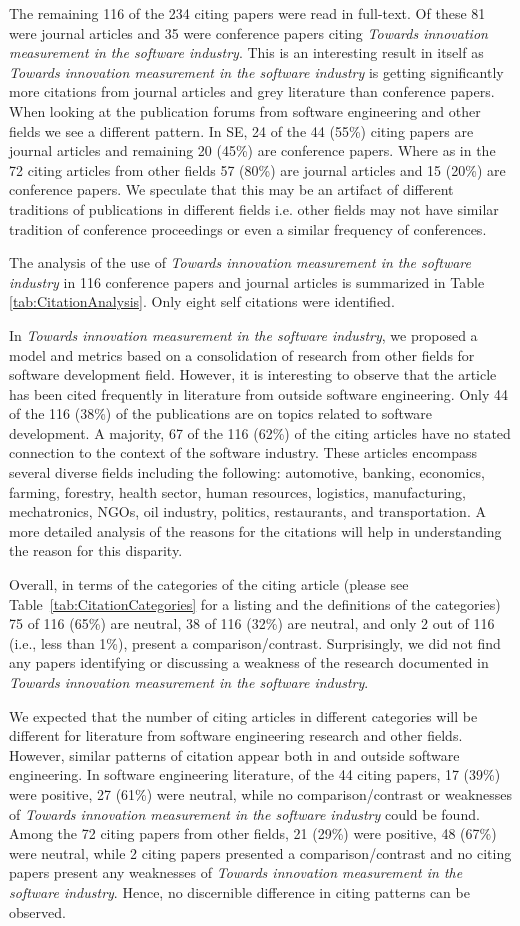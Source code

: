 \documentclass[sigconf,review]{acmart}
\newcommand{\theArticle}{\textit{Towards innovation measurement in the software industry}}
\begin{document}
The remaining 116 of the 234 citing papers were read in full-text. Of these 81 were journal articles and 35 were conference papers citing \theArticle. This is an interesting result in itself as \theArticle{} is getting significantly more citations from journal articles and grey literature than conference papers. When looking at the publication forums from software engineering and other fields we see a different pattern. In SE, 24 of the 44 (55\%) citing papers are journal articles and remaining 20 (45\%) are conference papers. Where as in the 72 citing articles from other fields 57 (80\%) are journal articles and 15 (20\%) are conference papers. We speculate that this may be an artifact of different traditions of publications in different fields i.e. other fields may not have similar tradition of conference proceedings or even a similar frequency of conferences.

The analysis of the use of \theArticle{} in 116 conference papers and journal articles is summarized in Table \ref{tab:CitationAnalysis}. Only eight self citations were identified. 

In \theArticle, we proposed a model and metrics based on a consolidation of research from other fields for software development field. However, it is interesting to observe that the article has been cited frequently in literature from outside software engineering. Only 44 of the 116 (38\%) of the publications are on topics related to software development. A majority, 67 of the 116 (62\%) of the citing articles have no stated connection to the context of the software industry. These articles encompass several diverse fields including the following: automotive, banking, economics, farming, forestry, health sector, human resources, logistics, manufacturing, mechatronics, NGOs, oil industry, politics, restaurants, and transportation.  A more detailed analysis of the reasons for the citations will help in understanding the reason for this disparity.

Overall, in terms of the categories of the citing article (please see Table~\ref{tab:CitationCategories} for a listing and the definitions of the categories) 75 of 116 (65\%) are neutral, 38 of 116 (32\%) are neutral, and only 2 out of 116 (i.e., less than 1\%), present a comparison\slash contrast. Surprisingly, we did not find any papers identifying or discussing a weakness of the research documented in \theArticle.
 
We expected that the number of citing articles in different categories will be different for literature from software engineering research and other fields. However, similar patterns of citation appear both in and outside software engineering. In software engineering literature, of the 44 citing papers, 17 (39\%) were positive, 27 (61\%) were neutral, while no comparison\slash contrast or weaknesses of \theArticle{} could be found. Among the 72 citing papers from other fields, 21 (29\%) were positive, 48 (67\%) were neutral, while 2 citing papers presented a comparison\slash contrast and no citing papers present any weaknesses of \theArticle. Hence, no discernible difference in citing patterns can be observed. 
\end{document}
